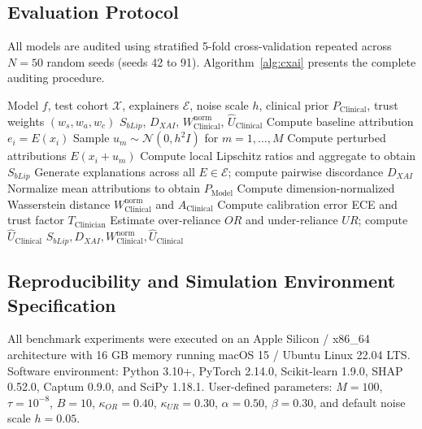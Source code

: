 \documentclass[3p,times,procedia]{elsarticle}
\theoremstyle{definition}
\begin{document}
\subsection{Evaluation Protocol}

All models are audited using stratified 5-fold cross-validation repeated across $N=50$ random seeds (seeds 42 to 91). Algorithm~\ref{alg:cxai} presents the complete auditing procedure.

\begin{algorithm}[t]
\caption{C-XAI Quantitative Auditing Procedure}
\label{alg:cxai}
\begin{algorithmic}[1]
\Require Model $f$, test cohort $\mathcal{X}$, explainers $\mathcal{E}$, noise scale $h$, clinical prior $P_{\mathrm{Clinical}}$, trust weights $(w_s, w_a, w_c)$
\Ensure $S_{bLip}$, $D_{XAI}$, $W_{\mathrm{Clinical}}^{\mathrm{norm}}$, $\widehat{U}_{\mathrm{Clinical}}$
    \State Compute baseline attribution $e_i = E(x_i)$
    \State Sample $u_m \sim \mathcal{N}(0, h^2 I)$ for $m=1,\dots,M$
    \State Compute perturbed attributions $E(x_i + u_m)$
    \State Compute local Lipschitz ratios and aggregate to obtain $S_{bLip}$
\EndFor
\State Generate explanations across all $E \in \mathcal{E}$; compute pairwise discordance $D_{XAI}$
\State Normalize mean attributions to obtain $P_{\mathrm{Model}}$
\State Compute dimension-normalized Wasserstein distance $W_{\mathrm{Clinical}}^{\mathrm{norm}}$ and $A_{\mathrm{Clinical}}$
\State Compute calibration error ECE and trust factor $T_{\mathrm{Clinician}}$
\State Estimate over-reliance $OR$ and under-reliance $UR$; compute $\widehat{U}_{\mathrm{Clinical}}$
\State \Return $S_{bLip}, D_{XAI}, W_{\mathrm{Clinical}}^{\mathrm{norm}}, \widehat{U}_{\mathrm{Clinical}}$
\end{algorithmic}
\end{algorithm}

\subsection{Reproducibility and Simulation Environment Specification}

All benchmark experiments were executed on an Apple Silicon / x86\_64 architecture with 16 GB memory running macOS 15 / Ubuntu Linux 22.04 LTS. Software environment: Python 3.10+, PyTorch 2.14.0, Scikit-learn 1.9.0, SHAP 0.52.0, Captum 0.9.0, and SciPy 1.18.1. User-defined parameters: $M=100$, $\tau=10^{-8}$, $B=10$, $\kappa_{OR}=0.40$, $\kappa_{UR}=0.30$, $\alpha=0.50$, $\beta=0.30$, and default noise scale $h=0.05$.
\end{document}
